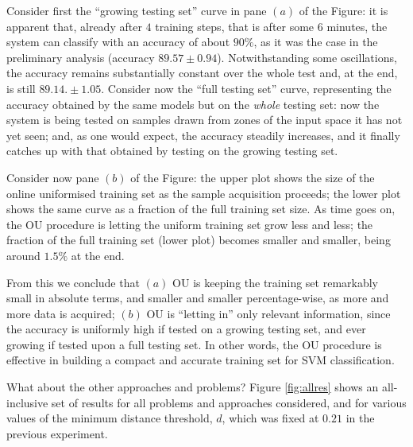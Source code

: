 Consider first the ``growing testing set'' curve in pane $(a)$ of the
Figure: it is apparent that, already after $4$ training steps, that is
after some $6$ minutes, the system can classify with an accuracy of
about $90\%$, as it was the case in the preliminary analysis (accuracy
$89.57 \pm 0.94$). Notwithstanding some oscillations, the accuracy
remains substantially constant over the whole test and, at the end, is
still $89.14. \pm 1.05$. Consider now the ``full testing set'' curve,
representing the accuracy obtained by the same models but on the
\emph{whole} testing set: now the system is being tested on samples
drawn from zones of the input space it has not yet seen; and, as one
would expect, the accuracy steadily increases, and it finally catches
up with that obtained by testing on the growing testing set.

Consider now pane $(b)$ of the Figure: the upper plot shows the size
of the online uniformised training set as the sample acquisition
proceeds; the lower plot shows the same curve as a fraction of the
full training set size. As time goes on, the OU procedure is letting
the uniform training set grow less and less; the fraction of the full
training set (lower plot) becomes smaller and smaller, being around
$1.5\%$ at the end.

From this we conclude that $(a)$ OU is keeping the training set
remarkably small in absolute terms, and smaller and smaller
percentage-wise, as more and more data is acquired; $(b)$ OU is
``letting in'' only relevant information, since the accuracy is
uniformly high if tested on a growing testing set, and ever growing if
tested upon a full testing set. In other words, the OU procedure is
effective in building a compact and accurate training set for SVM
classification.

What about the other approaches and problems? Figure \ref{fig:allres}
shows an all-inclusive set of results for all problems and approaches
considered, and for various values of the minimum distance threshold,
$d$, which was fixed at $0.21$ in the previous experiment.

